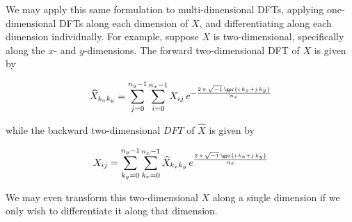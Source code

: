We may apply this same formulation to multi-dimensional DFTs, applying one-dimensional DFTs along each dimension of $X$, and differentiating along each dimension individually. For example, suppose $X$ is two-dimensional, specifically along the $x$- and $y$-dimensions. The forward two-dimensional DFT of $X$ is given by

\begin{equation}
	\widehat{X}_{k_x k_y} = \sum_{j = 0}^{n_y-1} \sum_{i = 0}^{n_x-1} X_{ij}\,e^{-\frac{2\,\pi\,\sqrt{-1}\,\gpr{i\,k_x + j\,k_y}}{n_x}}
\end{equation}

while the backward two-dimensional $DFT$ of $\widehat{X}$ is given by

\begin{equation}
	X_{ij} = \sum_{k_y = 0}^{n_y-1} \sum_{k_x = 0}^{n_x-1} \widehat{X}_{k_x k_y}\,e^{\frac{2\,\pi\,\sqrt{-1}\,\gpr{i\,k_x + j\,k_y}}{n_x}}
\end{equation}

We may even transform this two-dimensional $X$ along a single dimension if we only wish to differentiate it along that dimension.

